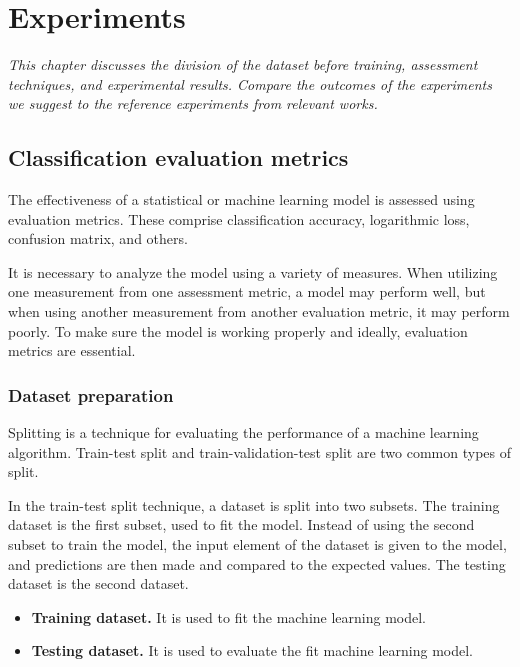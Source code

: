 \chapter{Experiments}
\label{chap:experiments}
	\textit{\hspace{0.5cm}This chapter discusses the division of the dataset before training, assessment techniques, and experimental results. Compare the outcomes of the experiments we suggest to the reference experiments from relevant works.}
\minitoc


\section{Classification evaluation metrics}
\label{sec:class_metrics}
\hspace{0.5cm}The effectiveness of a statistical or machine learning model is assessed using evaluation metrics. These comprise classification accuracy, logarithmic loss, confusion matrix, and others. 

It is necessary to analyze the model using a variety of measures. When utilizing one measurement from one assessment metric, a model may perform well, but when using another measurement from another evaluation metric, it may perform poorly. To make sure the model is working properly and ideally, evaluation metrics are essential.

\subsection{Dataset preparation}
\hspace{0.5cm}Splitting is a technique for evaluating the performance of a machine learning algorithm. Train-test split and train-validation-test split are two common types of split.

In the train-test split technique, a dataset is split into two subsets.
The training dataset is the first subset, used to fit the model. Instead of using the second subset to train the model, the input element of the dataset is given to the model, and predictions are then made and compared to the expected values. The testing dataset is the second dataset.
\begin{itemize}
	\item \textbf{Training dataset.} It is used to fit the machine learning model.
	\item \textbf{Testing dataset.} It is used to evaluate the fit machine learning model.
\end{itemize}

